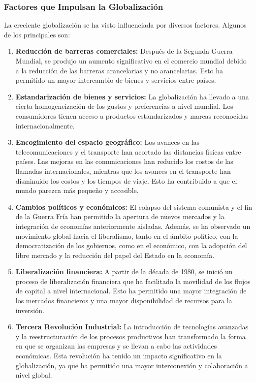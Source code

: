 \documentclass[
  jou,
  floatsintext,
  longtable,
  a4paper,
  nolmodern,
  notxfonts,
  notimes,
  12pt,
  colorlinks=true,linkcolor=blue,citecolor=blue,urlcolor=blue]{apa7}
\begin{document}
\subsubsection{Factores que Impulsan la
Globalización}\label{factores-que-impulsan-la-globalizaciuxf3n}

La creciente globalización se ha visto influenciada por diversos
factores. Algunos de los principales son:

\begin{enumerate}
\def\labelenumi{\arabic{enumi}.}
\item
  \textbf{Reducción de barreras comerciales:} Después de la Segunda
  Guerra Mundial, se produjo un aumento significativo en el comercio
  mundial debido a la reducción de las barreras arancelarias y no
  arancelarias. Esto ha permitido un mayor intercambio de bienes y
  servicios entre países.
\item
  \textbf{Estandarización de bienes y servicios:} La globalización ha
  llevado a una cierta homogeneización de los gustos y preferencias a
  nivel mundial. Los consumidores tienen acceso a productos
  estandarizados y marcas reconocidas internacionalmente.
\item
  \textbf{Encogimiento del espacio geográfico:} Los avances en las
  telecomunicaciones y el transporte han acortado las distancias físicas
  entre países. Las mejoras en las comunicaciones han reducido los
  costos de las llamadas internacionales, mientras que los avances en el
  transporte han disminuido los costos y los tiempos de viaje. Esto ha
  contribuido a que el mundo parezca más pequeño y accesible.
\item
  \textbf{Cambios políticos y económicos:} El colapso del sistema
  comunista y el fin de la Guerra Fría han permitido la apertura de
  nuevos mercados y la integración de economías anteriormente aisladas.
  Además, se ha observado un movimiento global hacia el liberalismo,
  tanto en el ámbito político, con la democratización de los gobiernos,
  como en el económico, con la adopción del libre mercado y la reducción
  del papel del Estado en la economía.
\item
  \textbf{Liberalización financiera:} A partir de la década de 1980, se
  inició un proceso de liberalización financiera que ha facilitado la
  movilidad de los flujos de capital a nivel internacional. Esto ha
  permitido una mayor integración de los mercados financieros y una
  mayor disponibilidad de recursos para la inversión.
\item
  \textbf{Tercera Revolución Industrial:} La introducción de tecnologías
  avanzadas y la reestructuración de los procesos productivos han
  transformado la forma en que se organizan las empresas y se llevan a
  cabo las actividades económicas. Esta revolución ha tenido un impacto
  significativo en la globalización, ya que ha permitido una mayor
  interconexión y colaboración a nivel global.
\end{enumerate}
\end{document}
